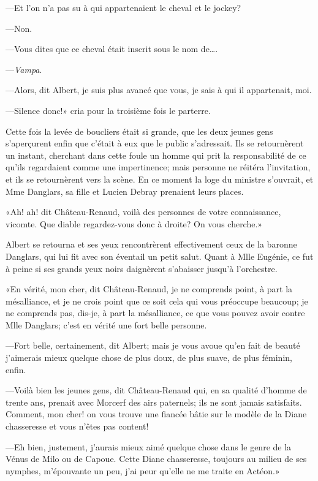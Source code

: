 —Et l'on n'a pas su à qui appartenaient le cheval et le jockey? 

—Non. 

—Vous dites que ce cheval était inscrit sous le nom de\dots. 

—\textit{Vampa}. 

—Alors, dit Albert, je suis plus avancé que vous, je sais à qui il appartenait, moi. 

—Silence donc!» cria pour la troisième fois le parterre. 

Cette fois la levée de boucliers était si grande, que les deux jeunes gens s'aperçurent enfin que c'était à eux que le public s'adressait. Ils se retournèrent un instant, cherchant dans cette foule un homme qui prit la responsabilité de ce qu'ils regardaient comme une impertinence; mais personne ne réitéra l'invitation, et ils se retournèrent vers la scène. En ce moment la loge du ministre s'ouvrait, et Mme Danglars, sa fille et Lucien Debray prenaient leurs places. 

«Ah! ah! dit Château-Renaud, voilà des personnes de votre connaissance, vicomte. Que diable regardez-vous donc à droite? On vous cherche.» 

Albert se retourna et ses yeux rencontrèrent effectivement ceux de la baronne Danglars, qui lui fit avec son éventail un petit salut. Quant à Mlle Eugénie, ce fut à peine si ses grands yeux noirs daignèrent s'abaisser jusqu'à l'orchestre. 

«En vérité, mon cher, dit Château-Renaud, je ne comprends point, à part la mésalliance, et je ne crois point que ce soit cela qui vous préoccupe beaucoup; je ne comprends pas, dis-je, à part la mésalliance, ce que vous pouvez avoir contre Mlle Danglars; c'est en vérité une fort belle personne. 

—Fort belle, certainement, dit Albert; mais je vous avoue qu'en fait de beauté j'aimerais mieux quelque chose de plus doux, de plus suave, de plus féminin, enfin. 

—Voilà bien les jeunes gens, dit Château-Renaud qui, en sa qualité d'homme de trente ans, prenait avec Morcerf des airs paternels; ils ne sont jamais satisfaits. Comment, mon cher! on vous trouve une fiancée bâtie sur le modèle de la Diane chasseresse et vous n'êtes pas content! 

—Eh bien, justement, j'aurais mieux aimé quelque chose dans le genre de la Vénus de Milo ou de Capoue. Cette Diane chasseresse, toujours au milieu de ses nymphes, m'épouvante un peu, j'ai peur qu'elle ne me traite en Actéon.» 

